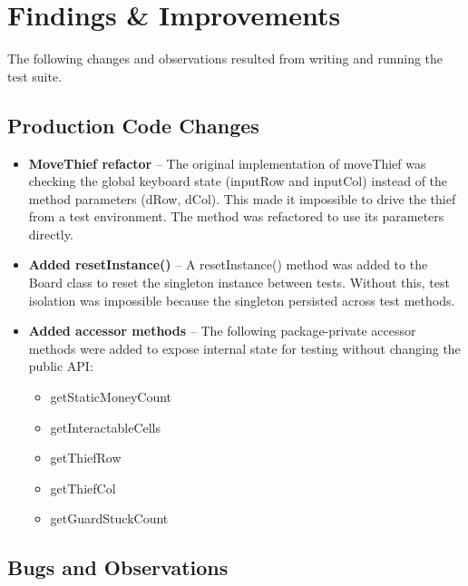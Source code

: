 \documentclass[12pt]{article}
\begin{document}
\section{Findings \& Improvements}

The following changes and observations resulted from writing and running the test suite.

\subsection{Production Code Changes}

\begin{itemize}

\item \textbf{MoveThief refactor} -- The original implementation of moveThief was checking the global keyboard state (inputRow and inputCol) instead of the method parameters (dRow, dCol). This made it impossible to drive the thief from a test environment. The method was refactored to use its parameters directly.

\item \textbf{Added resetInstance()} -- A resetInstance() method was added to the Board class to reset the singleton instance between tests. Without this, test isolation was impossible because the singleton persisted across test methods.

\item \textbf{Added accessor methods} -- The following package-private accessor methods were added to expose internal state for testing without changing the public API:
\begin{itemize}
\item getStaticMoneyCount
\item getInteractableCells
\item getThiefRow
\item getThiefCol
\item getGuardStuckCount
\end{itemize}

\end{itemize}

\subsection{Bugs and Observations}
\end{document}
